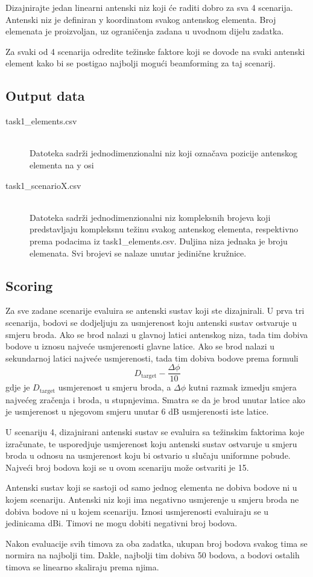 \documentclass{article}[a4paper]
\begin{document}
Dizajnirajte jedan linearni antenski niz koji će raditi dobro za sva 4 scenarija. Antenski niz je definiran y koordinatom svakog antenskog elementa. Broj elemenata je proizvoljan, uz ograničenja zadana u uvodnom dijelu zadatka.

Za svaki od 4 scenarija odredite težinske faktore koji se dovode na svaki antenski element kako bi se postigao najbolji mogući beamforming za taj scenarij.

\subsection*{Output data}

\begin{description}
	\item[task1\_elements.csv] \,\\ Datoteka sadrži jednodimenzionalni niz koji označava pozicije antenskog elementa na y osi
	\item[task1\_scenarioX.csv] \,\\ Datoteka sadrži jednodimenzionalni niz kompleksnih brojeva koji predstavljaju kompleksnu težinu svakog antenskog elementa, respektivno prema podacima iz task1\_elements.csv. Duljina niza jednaka je broju elemenata. Svi brojevi se nalaze unutar jedinične kružnice.
\end{description}

\subsection*{Scoring}

Za sve zadane scenarije evaluira se antenski sustav koji ste dizajnirali. U prva tri scenarija, bodovi se dodjeljuju za usmjerenost koju antenski sustav ostvaruje u smjeru broda.
Ako se brod nalazi u glavnoj latici antenskog niza, tada tim dobiva bodove u iznosu najveće usmjerenosti glavne latice. Ako se brod nalazi u sekundarnoj latici najveće usmjerenosti, tada tim dobiva bodove prema formuli
\[ D_\textrm{target} - \dfrac{\varDelta \phi}{10} \]
gdje je $D_\textrm{target}$ usmjerenost u smjeru broda, a $\varDelta \phi$ kutni razmak izmedju smjera najvećeg zračenja i broda, u stupnjevima. Smatra se da je brod unutar latice ako je usmjerenost u njegovom smjeru unutar 6 dB usmjerenosti iste latice.

U scenariju 4, dizajnirani antenski sustav se evaluira sa težinskim faktorima koje izračunate, te usporedjuje usmjerenost koju antenski sustav ostvaruje u smjeru broda u odnosu na usmjerenost koju bi ostvario u slučaju uniformne pobude. Najveći broj bodova koji se u ovom scenariju može ostvariti je 15.

Antenski sustav koji se sastoji od samo jednog elementa ne dobiva bodove ni u kojem scenariju. Antenski niz koji ima negativno usmjerenje u smjeru broda ne dobiva bodove ni u kojem scenariju. Iznosi usmjerenosti evaluiraju se u jedinicama dBi. Timovi ne mogu dobiti negativni broj bodova.

Nakon evaluacije svih timova za oba zadatka, ukupan broj bodova svakog tima se normira na najbolji tim. Dakle, najbolji tim dobiva 50 bodova, a bodovi ostalih timova se linearno skaliraju prema njima.
\end{document}
